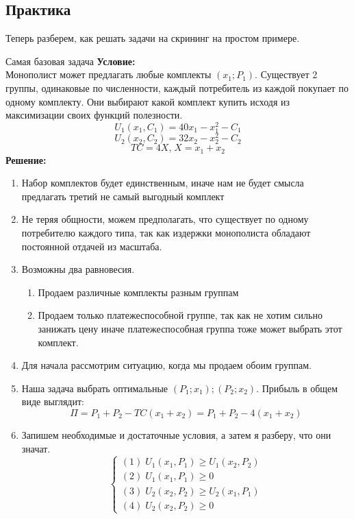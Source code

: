 \subsection{Практика}
Теперь разберем, как решать задачи на скрининг на простом примере.
\begin{mybox}{Самая базовая задача}
\textbf{Условие:}\\ Монополист может предлагать любые комплекты $(x_1;P_1)$. Существует 2 группы, одинаковые по численности, каждый потребитель из каждой покупает по одному комплекту. Они выбирают какой комплект купить исходя из максимизации своих функций полезности. \\
$$U_1(x_1,C_1)=40x_1-x_1^2-C_1$$
$$U_2(x_2,C_2)=32x_2-x_2^2-C_2$$
$$TC=4X\text{,}\;X=x_1+x_2$$
\tcblower
\textbf{Решение:}
\begin{enumerate}
    \item Набор комплектов будет единственным, иначе нам не будет смысла предлагать третий не самый выгодный комплект
    \item Не теряя общности, можем предполагать, что существует по одному потребителю каждого типа, так как издержки монополиста обладают постоянной отдачей из масштаба.
    \item Возможны два равновесия. \begin{enumerate}
        \item Продаем различные комплекты разным группам
        \item Продаем только платежеспособной группе, так как не хотим сильно занижать цену иначе платежеспособная группа тоже может выбрать этот комплект.
    \end{enumerate}
    \item Для начала рассмотрим ситуацию, когда мы продаем обоим группам.
    \item Наша задача выбрать оптимальные $(P_1;x_1);(P_2;x_2)$. Прибыль в общем виде выглядит: $$\Pi=P_1+P_2-TC(x_1+x_2)=P_1+P_2-4(x_1+x_2)$$
    \item Запишем необходимые и достаточные условия, а затем я разберу, что они значат.
    \begin{equation*}
     \begin{cases}
       (1)\;U_1(x_1,P_1)\geq U_1(x_2,P_2)
       \\
       (2)\;U_1(x_1,P_1)\geq 0
       \\
       (3)\;U_2(x_2,P_2)\geq U_2(x_1,P_1)
       \\
       (4)\;U_2(x_2,P_2)\geq 0
     \end{cases}

\end{equation*}
\end{enumerate}
\end{mybox}
